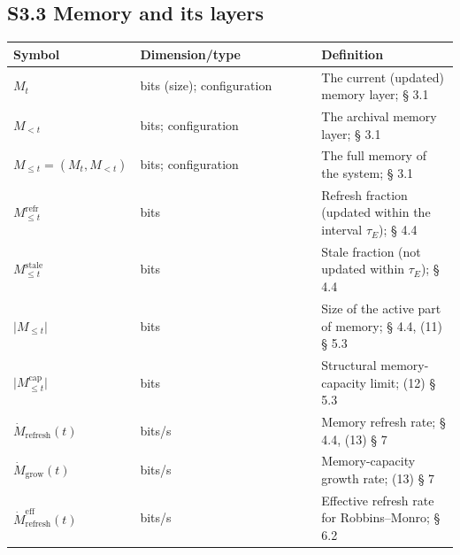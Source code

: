 \documentclass[pdflatex,sn-mathphys-ay]{sn-jnl}
\providecommand{\lt}{<}\providecommand{\gt}{>}
\begin{document}
\subsection*{S3.3 Memory and its layers}\label{s3.3-memory-and-its-layers}



\begin{center}\small
\begin{tabular}{@{} >{\raggedright\arraybackslash}p{0.2105\linewidth} >{\raggedright\arraybackslash}p{0.4474\linewidth} >{\raggedright\arraybackslash}p{0.3421\linewidth}@{}}
\toprule

\begin{minipage}[b]{\linewidth}\raggedright

Symbol

\end{minipage} & \begin{minipage}[b]{\linewidth}\raggedright

Dimension/type

\end{minipage} & \begin{minipage}[b]{\linewidth}\raggedright

Definition

\end{minipage} \\

\midrule

\(M_t\) & bits (size); configuration & The current (updated) memory layer; § 3.1 \\

\(M_{\lt t}\) & bits; configuration & The archival memory layer; § 3.1 \\

\(M_{\le t} = (M_t, M_{\lt t})\) & bits; configuration & The full memory of the system; § 3.1 \\

\(M_{\le t}^{\text{refr}}\) & bits & Refresh fraction (updated within the interval \(\tau_E\)); § 4.4 \\

\(M_{\le t}^{\text{stale}}\) & bits & Stale fraction (not updated within \(\tau_E\)); § 4.4 \\

\(\lvert M_{\le t}\rvert\) & bits & Size of the active part of memory; § 4.4, (11) § 5.3 \\

\(\lvert M_{\le t}^{\text{cap}}\rvert\) & bits & Structural memory-capacity limit; (12) § 5.3 \\

\(\dot{M}_{\text{refresh}}(t)\) & bits/s & Memory refresh rate; § 4.4, (13) § 7 \\

\(\dot{M}_{\text{grow}}(t)\) & bits/s & Memory-capacity growth rate; (13) § 7 \\

\(\dot{M}_{\text{refresh}}^{\text{eff}}(t)\) & bits/s & Effective refresh rate for Robbins--Monro; § 6.2 \\

\bottomrule
\end{tabular}
\end{center}
\end{document}
